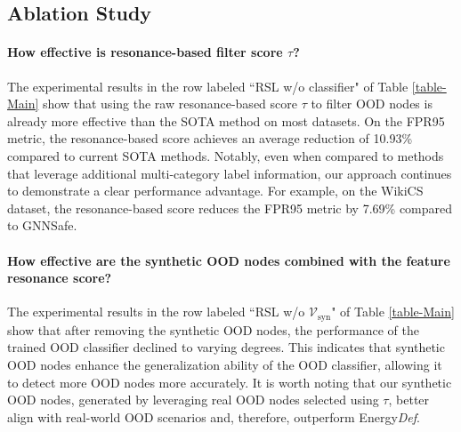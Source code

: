 \subsection{Ablation Study}\label{subsec-ablation-result}


\paragraph{How effective is resonance-based filter score $\tau$?} 
The experimental results in the row labeled ``RSL w/o classifier" of Table \ref{table-Main} show that using the raw resonance-based score $\tau$ to filter OOD nodes is already more effective than the SOTA method on most datasets. On the FPR95 metric, the resonance-based score achieves an average reduction of 10.93\% compared to current SOTA methods. Notably, even when compared to methods that leverage additional multi-category label information, our approach continues to demonstrate a clear performance advantage. For example, on the WikiCS dataset, the resonance-based score reduces the FPR95 metric by 7.69\% compared to GNNSafe.


\paragraph{How effective are the synthetic OOD nodes combined with the feature resonance score?}
 The experimental results in the row labeled ``RSL w/o $\mathcal{V}_{\mathrm{syn}}$" of Table \ref{table-Main} show that after removing the synthetic OOD nodes, the performance of the trained OOD classifier declined to varying degrees. This indicates that synthetic OOD nodes enhance the generalization ability of the OOD classifier, allowing it to detect more OOD nodes more accurately.
 It is worth noting that our synthetic OOD nodes, generated by leveraging real OOD nodes selected using $\tau$, better align with real-world OOD scenarios and, therefore, outperform Energy\textit{Def}.







